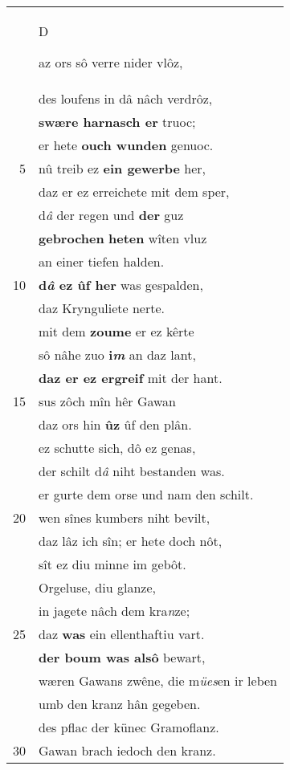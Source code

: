 \documentclass[8pt,a4paper,notitlepage]{article}
\begin{document}
\begin{table}[ht]
\begin{minipage}[t]{0.5\linewidth}
\begin{tabular}{rl}
 & \begin{large}D\end{large}az ors sô verre nider vlôz,\\ 
 & des loufens in dâ nâch verdrôz,\\ 
 & \textbf{swære harnasch er} truoc;\\ 
 & er hete \textbf{ouch wunden} genuoc.\\ 
5 & nû treib ez \textbf{ein gewerbe} her,\\ 
 & daz er ez erreichete mit dem sper,\\ 
 & d\textit{â} der regen und \textbf{der} guz\\ 
 & \textbf{gebrochen} \textbf{heten} wîten vluz\\ 
 & an einer tiefen halden.\\ 
10 & \textbf{d\textit{â} ez ûf her} was gespalden,\\ 
 & daz Krynguliete nerte.\\ 
 & mit dem \textbf{zoume} er ez kêrte\\ 
 & sô nâhe zuo \textbf{i\textit{m}} an daz lant,\\ 
 & \textbf{daz er ez ergreif} mit der hant.\\ 
15 & sus zôch mîn hêr Gawan\\ 
 & daz ors hin \textbf{ûz} ûf den plân.\\ 
 & ez schutte sich, dô ez genas,\\ 
 & der schilt d\textit{â} niht bestanden was.\\ 
 & er gurte dem orse und nam den schilt.\\ 
20 & wen sînes kumbers niht bevilt,\\ 
 & daz lâz ich sîn; er hete doch nôt,\\ 
 & sît ez diu minne im gebôt.\\ 
 & Orgeluse, diu glanze,\\ 
 & in jagete nâch dem kra\textit{n}ze;\\ 
25 & daz \textbf{was} ein ellenthaftiu vart.\\ 
 & \textbf{der boum was alsô} bewart,\\ 
 & wæren Gawans zwêne, die m\textit{ües}en ir leben\\ 
 & umb den kranz hân gegeben.\\ 
 & des pflac der künec Gramoflanz.\\ 
30 & Gawan brach iedoch den kranz.\\ 
\end{tabular}
\scriptsize

\end{minipage}
\end{table}
\end{document}
